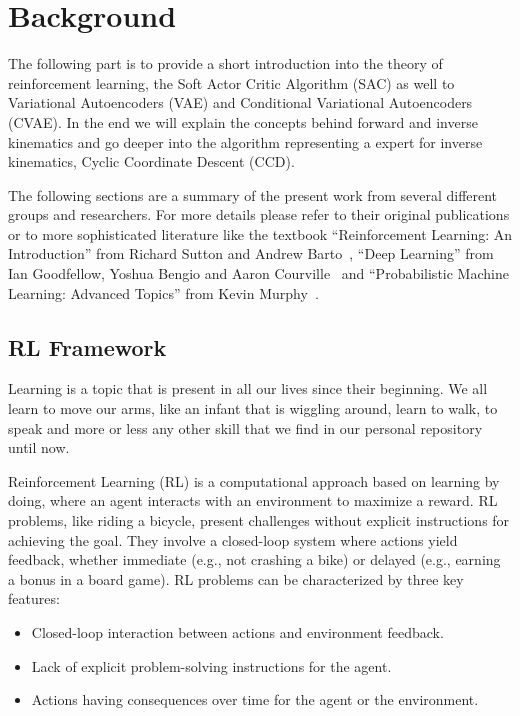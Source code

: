 \chapter{Background}\label{chap:background}

The following part is to provide a short introduction into the theory of reinforcement learning, the Soft Actor Critic Algorithm (SAC) as well to Variational Autoencoders (VAE) and Conditional Variational Autoencoders (CVAE). In the end we will explain the concepts behind forward and inverse kinematics and go deeper into the algorithm representing a expert for inverse kinematics, Cyclic Coordinate Descent (CCD).

The following sections are a summary of the present work from several different groups and researchers. For more details please refer to their original publications or to more sophisticated literature like the textbook ``Reinforcement Learning: An Introduction'' from Richard Sutton and Andrew Barto~\cite{SuttonBartoRLBook}, ``Deep Learning'' from Ian Goodfellow, Yoshua Bengio and Aaron Courville~\cite{DeepLearningTextBook} and ``Probabilistic Machine Learning: Advanced Topics'' from Kevin Murphy~\cite{pml2Book}. 

\section{RL Framework}\label{sec:RL-Framework}

Learning is a topic that is present in all our lives since their beginning. We all learn to move our arms, like an infant that is wiggling around, learn to walk, to speak and more or less any other skill that we find in our personal repository until now.  

Reinforcement Learning (RL) is a computational approach based on learning by doing, where an agent interacts with an environment to maximize a reward. RL problems, like riding a bicycle, present challenges without explicit instructions for achieving the goal. They involve a closed-loop system where actions yield feedback, whether immediate (e.g., not crashing a bike) or delayed (e.g., earning a bonus in a board game). RL problems can be characterized by three key features:

\begin{itemize}
    \item Closed-loop interaction between actions and environment feedback.
    \item Lack of explicit problem-solving instructions for the agent.
    \item Actions having consequences over time for the agent or the environment.
\end{itemize}

